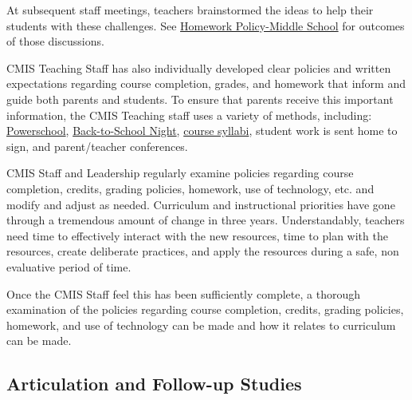 \documentclass{report}
\begin{document}
\begin{findings}
At subsequent staff meetings, teachers brainstormed the ideas to help their students with these challenges. See \href{https://docs.google.com/a/cmis.ac.th/document/d/16b9QZYYXoRK-nJdFtCsW13NB9IwzAu8rlmTMnJ6usdo/edit?usp=sharing}{Homework Policy-Middle School} for outcomes of those discussions. 


CMIS Teaching Staff has also individually developed clear policies and written expectations regarding course completion, grades, and homework that inform and guide both parents and students. To ensure that parents receive this important information, the CMIS Teaching staff uses a variety of methods, including: \href{https://cmis.powerschool.com/teachers/pw.html}{Powerschool}, \href{https://drive.google.com/drive/folders/0B0TYmzaZNi3fZTFCbmEtZzdVZnM?usp=sharing}{Back-to-School Night}, \href{https://drive.google.com/drive/folders/0ByVFfrm0zfolNmdnMzU2S2xRSWs?usp=sharing}{course syllabi}, student work is sent home to sign, and parent/teacher conferences. 


CMIS Staff and Leadership regularly examine policies regarding course completion, credits, grading policies, homework, use of technology, etc. and modify and adjust as needed. Curriculum and instructional priorities have gone through a tremendous amount of change in three years. Understandably, teachers need time to effectively interact with the new resources, time to plan with the resources, create deliberate practices, and apply the resources during a safe, non evaluative period of time. 

Once the CMIS Staff feel this has been sufficiently complete, a thorough examination of the policies regarding course completion, credits, grading policies, homework, and use of technology can be made and how it relates to curriculum can be made. 
\end{findings}

\subsection{Articulation and Follow-up Studies}


\end{document}

